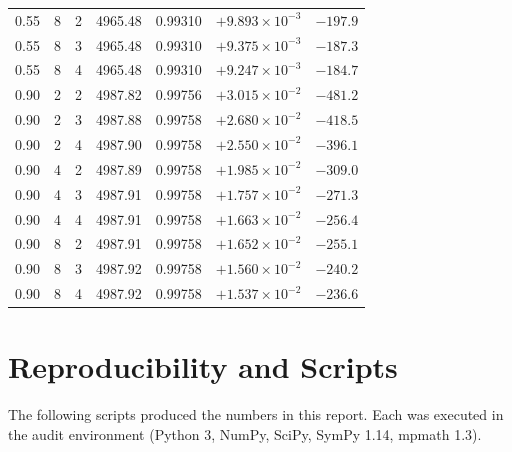 \documentclass[11pt, a4paper]{article}
\theoremstyle{remark}
\theoremstyle{definition}
\begin{document}
\begin{table}[H]
\begin{tabular}{@{}rrrrrrr@{}}
0.55 & 8 & 2 & 4965.48 & 0.99310 & $+9.893\times10^{-3}$ & $-197.9$ \\
0.55 & 8 & 3 & 4965.48 & 0.99310 & $+9.375\times10^{-3}$ & $-187.3$ \\
0.55 & 8 & 4 & 4965.48 & 0.99310 & $+9.247\times10^{-3}$ & $-184.7$ \\
0.90 & 2 & 2 & 4987.82 & 0.99756 & $+3.015\times10^{-2}$ & $-481.2$ \\
0.90 & 2 & 3 & 4987.88 & 0.99758 & $+2.680\times10^{-2}$ & $-418.5$ \\
0.90 & 2 & 4 & 4987.90 & 0.99758 & $+2.550\times10^{-2}$ & $-396.1$ \\
0.90 & 4 & 2 & 4987.89 & 0.99758 & $+1.985\times10^{-2}$ & $-309.0$ \\
0.90 & 4 & 3 & 4987.91 & 0.99758 & $+1.757\times10^{-2}$ & $-271.3$ \\
0.90 & 4 & 4 & 4987.91 & 0.99758 & $+1.663\times10^{-2}$ & $-256.4$ \\
0.90 & 8 & 2 & 4987.91 & 0.99758 & $+1.652\times10^{-2}$ & $-255.1$ \\
0.90 & 8 & 3 & 4987.92 & 0.99758 & $+1.560\times10^{-2}$ & $-240.2$ \\
0.90 & 8 & 4 & 4987.92 & 0.99758 & $+1.537\times10^{-2}$ & $-236.6$ \\
\bottomrule
\end{tabular}
\end{table}

\section{Reproducibility and Scripts}
\label{sec:appB}

The following scripts produced the numbers in this report. Each was executed in the audit environment (Python 3, NumPy, SciPy, SymPy 1.14, mpmath 1.3).
\end{document}
